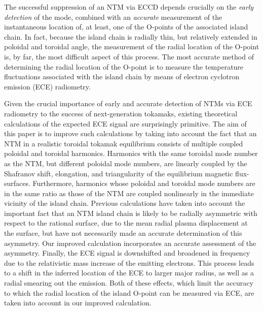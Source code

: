 \documentclass[12pt,prb,aps]{revtex4-1}
\begin{document}
The successful suppression of an NTM via ECCD depends crucially on the {\em early detection}\/ of the mode, combined with an {\em accurate}\/ measurement   of 
the instantaneous location of, at least, one of the O-points  of the associated island chain.\cite{eccd6} In fact, because the island chain is radially thin, 
but relatively extended in poloidal and toroidal angle, the measurement  of the radial location of the O-point is, by far,  the most difficult aspect of
this process. The most accurate method of determining the radial location of the O-point is to measure the temperature fluctuations associated with the island
chain by means of electron cyclotron emission (ECE) radiometry.\cite{ece1,ece2,ntm2,ece4}

Given the crucial importance of early and accurate detection of NTMs via ECE radiometry to the success of next-generation tokamaks, existing theoretical calculations of
the expected ECE signal are surprisingly primitive.\cite{eccd6,ece4,ece4a} The aim of this paper is to
improve such calculations by taking into account the fact that an NTM  in a realistic toroidal tokamak equilibrium consists of multiple coupled poloidal and toroidal harmonics. Harmonics with the same toroidal mode number as the NTM, but different poloidal mode numbers, are linearly coupled by the
Shafranov shift, elongation, and triangularity of the equilibrium magnetic flux-surfaces.\cite{tear2,tear3,tear5} Furthermore, harmonics whose poloidal and
toroidal mode numbers are in the same ratio as those of the NTM are coupled nonlinearly in the immediate vicinity of the island chain.\cite{ntm1,ntm2}
Previous calculations have taken into account the important fact that an NTM island chain is likely to be radially asymmetric with respect to the rational surface,\cite{ece6a,ece6} 
due to the mean radial plasma displacement at the  surface, but have not necessarily made an accurate
determination of this asymmetry.\cite{eccd6} Our improved calculation incorporates an accurate assessment of the asymmetry. Finally, the ECE signal 
is downshifted and broadened in frequency due to the relativistic mass increase of the emitting electrons.\cite{ece1,ece2,ece5}  This process leads to a shift in the inferred location
of the ECE  to larger major radius, as well as a radial smearing out the emission. Both of these effects, which limit the accuracy to which the
radial location of the island O-point can be measured via ECE,  are taken into account in our improved calculation.
\end{document}
